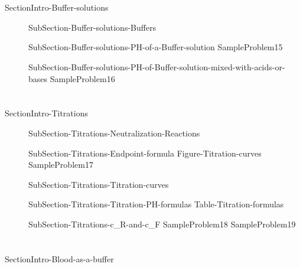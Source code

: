 \documentclass[main.tex]{subfiles}
\begin{document}
\section{\color{blue!30!black}{Buffer solutions}}{SectionIntro-Buffer-solutions}
\sloppy
\begin{description}
\item[] {SubSection-Buffer-solutions-Buffers}
\item[] {SubSection-Buffer-solutions-PH-of-a-Buffer-solution}
  {SampleProblem15}
\item[] {SubSection-Buffer-solutions-PH-of-Buffer-solution-mixed-with-acids-or-bases}
  {SampleProblem16}
\end{description}
\section{\color{blue!30!black}{Titrations}}{SectionIntro-Titrations}
\sloppy
\begin{description}
\item[] {SubSection-Titrations-Neutralization-Reactions}
\item[] {SubSection-Titrations-Endpoint-formula}
  {Figure-Titration-curves}
  {SampleProblem17}
\item[] {SubSection-Titrations-Titration-curves}
 
   
\item[] 
{SubSection-Titrations-Titration-PH-formulas}
   {Table-Titration-formulas}
\item[] 
{SubSection-Titrations-c_R-and-c_F}
   {SampleProblem18}
  {SampleProblem19}
\newpage
 
\end{description}
\section{\color{blue!30!black}{Blood as a buffer}}{SectionIntro-Blood-as-a-buffer}
 
\end{document}
